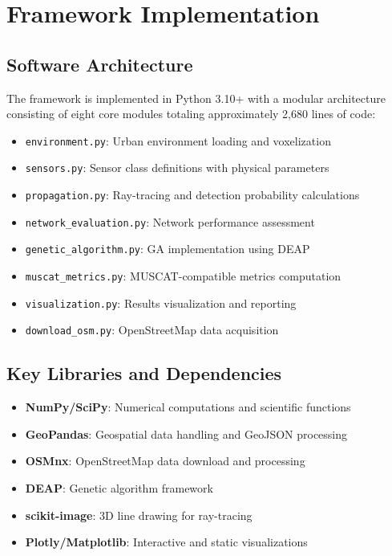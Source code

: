 
\section{Framework Implementation}

\subsection{Software Architecture}

The framework is implemented in Python 3.10+ with a modular architecture consisting of eight core modules totaling approximately 2,680 lines of code:

\begin{itemize}
\item \texttt{environment.py}: Urban environment loading and voxelization
\item \texttt{sensors.py}: Sensor class definitions with physical parameters
\item \texttt{propagation.py}: Ray-tracing and detection probability calculations
\item \texttt{network\_evaluation.py}: Network performance assessment
\item \texttt{genetic\_algorithm.py}: GA implementation using DEAP
\item \texttt{muscat\_metrics.py}: MUSCAT-compatible metrics computation
\item \texttt{visualization.py}: Results visualization and reporting
\item \texttt{download\_osm.py}: OpenStreetMap data acquisition
\end{itemize}

\subsection{Key Libraries and Dependencies}

\begin{itemize}
\item \textbf{NumPy/SciPy}: Numerical computations and scientific functions
\item \textbf{GeoPandas}: Geospatial data handling and GeoJSON processing
\item \textbf{OSMnx}: OpenStreetMap data download and processing
\item \textbf{DEAP}: Genetic algorithm framework
\item \textbf{scikit-image}: 3D line drawing for ray-tracing
\item \textbf{Plotly/Matplotlib}: Interactive and static visualizations
\end{itemize}

